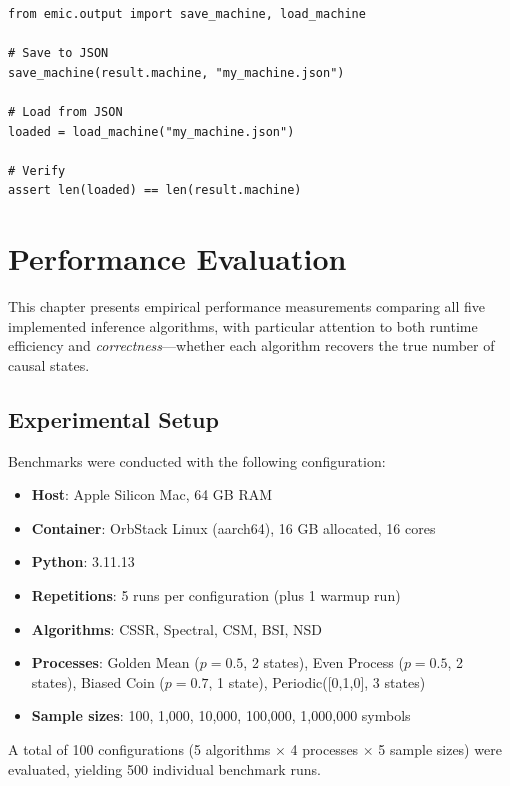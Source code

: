 \documentclass[11pt,a4paper]{report}
\theoremstyle{definition}
\theoremstyle{plain}
\begin{document}
\begin{lstlisting}[caption={Saving and loading machines}]
from emic.output import save_machine, load_machine

# Save to JSON
save_machine(result.machine, "my_machine.json")

# Load from JSON
loaded = load_machine("my_machine.json")

# Verify
assert len(loaded) == len(result.machine)
\end{lstlisting}

\chapter{Performance Evaluation}
\label{ch:performance}

This chapter presents empirical performance measurements comparing all five implemented inference algorithms, with particular attention to both runtime efficiency and \emph{correctness}---whether each algorithm recovers the true number of causal states.

\section{Experimental Setup}

Benchmarks were conducted with the following configuration:
\begin{itemize}
    \item \textbf{Host}: Apple Silicon Mac, 64 GB RAM
    \item \textbf{Container}: OrbStack Linux (aarch64), 16 GB allocated, 16 cores
    \item \textbf{Python}: 3.11.13
    \item \textbf{Repetitions}: 5 runs per configuration (plus 1 warmup run)
    \item \textbf{Algorithms}: CSSR, Spectral, CSM, BSI, NSD
    \item \textbf{Processes}: Golden Mean ($p=0.5$, 2 states), Even Process ($p=0.5$, 2 states), Biased Coin ($p=0.7$, 1 state), Periodic([0,1,0], 3 states)
    \item \textbf{Sample sizes}: 100, 1{,}000, 10{,}000, 100{,}000, 1{,}000{,}000 symbols
\end{itemize}

A total of 100 configurations (5 algorithms $\times$ 4 processes $\times$ 5 sample sizes) were evaluated, yielding 500 individual benchmark runs.
\end{document}
